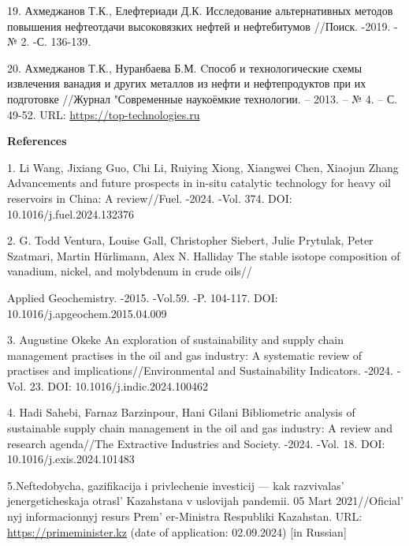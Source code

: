 \begin{references}
19. Ахмеджанов Т.К., Елефтериади Д.К. Исследование альтернативных
методов повышения нефтеотдачи высоковязких нефтей и нефтебитумов
//Поиск. -2019. -№ 2. -С. 136-139.

20. Ахмеджанов Т.К., Нуранбаева Б.М. Cпособ и технологические схемы
извлечения ванадия и других металлов из нефти и нефтепродуктов при их
подготовке //Журнал "Современные наукоёмкие технологии. -- 2013. -- № 4.
-- С. 49-52. URL:
\href{https://top-technologies.ru/ru/article/view?id=31603}{https://top-technologies.ru}
\end{references}

\begin{center}
  {\bfseries References}
  \end{center}
  \begin{references}


1. Li Wang, Jixiang Guo, Chi Li, Ruiying Xiong, Xiangwei Chen, Xiaojun
Zhang Advancements and future prospects in in-situ catalytic technology
for heavy oil reservoirs in China: A review//Fuel. -2024. -Vol. 374.
DOI: 10.1016/j.fuel.2024.132376

2. G. Todd Ventura, Louise Gall, Christopher Siebert, Julie Prytulak,
Peter Szatmari, Martin Hürlimann, Alex N. Halliday The stable isotope
composition of vanadium, nickel, and molybdenum in crude oils//

Applied Geochemistry. -2015. -Vol.59. -P. 104-117. DOI:
10.1016/j.apgeochem.2015.04.009

3. Augustine Okeke An exploration of sustainability and supply chain
management practises in the oil and gas industry: A systematic review of
practises and implications//Environmental and Sustainability Indicators.
-2024. -Vol. 23. DOI: 10.1016/j.indic.2024.100462

4. Hadi Sahebi, Farnaz Barzinpour, Hani Gilani Bibliometric analysis of
sustainable supply chain \linebreak management in the oil and gas industry: A
review and research agenda//The Extractive Industries and Society.
-2024. -Vol. 18. DOI: 10.1016/j.exis.2024.101483

5.Neftedobycha, gazifikacija i privlechenie investicij --- kak
razvivalas'{} jenergeticheskaja otrasl'{}
Kazahstana v uslovijah pandemii. 05 Mart
2021//Oficial' nyj informacionnyj resurs
Prem' er-Ministra Respubliki Kazahstan. URL:
\href{https://primeminister.kz/ru/news/neftedobycha-gazifikaciya-i-privlechenie-investiciy-kak-razvivalas-energeticheskaya-otrasl-kazahstana-v-usloviyah-pandemii-52034}{https://primeminister.kz}
(date of application: 02.09.2024) {[}in Russian{]}


\end{references}
